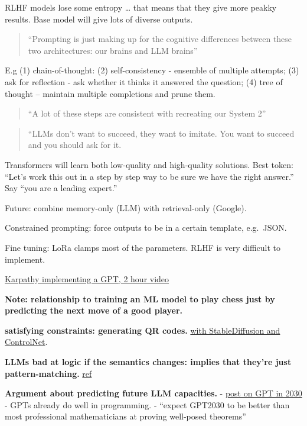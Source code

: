 \documentclass[
  11pt,
  letterpaper,
  DIV=11,
  numbers=noendperiod,
  oneside]{scrartcl}
\begin{document}
RLHF models lose some entropy \ldots{} that means that they give more
peakky results. Base model will give lots of diverse outputs.

\begin{quote}
``Prompting is just making up for the cognitive differences between
these two architectures: our brains and LLM brains''
\end{quote}

E.g (1) chain-of-thought: (2) self-consistency - ensemble of multiple
attempts; (3) ask for reflection - ask whether it thinks it answered the
question; (4) tree of thought -- maintain multiple completions and prune
them.

\begin{quote}
``A lot of these steps are consistent with recreating our System 2''
\end{quote}

\begin{quote}
``LLMs don't want to succeed, they want to imitate. You want to succeed
and you should ask for it.
\end{quote}

Transformers will learn both low-quality and high-quality solutions.
Best token: ``Let's work this out in a step by step way to be sure we
have the right answer.'' Say ``you are a leading expert.''

Future: combine memory-only (LLM) with retrieval-only (Google).

Constrained prompting: force outputs to be in a certain template,
e.g.~JSON.

Fine tuning: LoRa clamps most of the parameters. RLHF is very difficult
to implement.

\href{https://www.youtube.com/watch?v=kCc8FmEb1nY}{Karpathy implementing
a GPT, 2 hour video}

\textbf{Note: relationship to training an ML model to play chess just by
predicting the next move of a good player.}

\textbf{satisfying constraints: generating QR codes.}
\href{https://twitter.com/ben_ferns/status/1665907480600391682?s=20}{with
StableDiffusion and ControlNet}.

\textbf{LLMs bad at logic if the semantics changes: implies that they're
just pattern-matching.}
\href{https://twitter.com/arankomatsuzaki/status/1666799741785759745}{ref}

\textbf{Argument about predicting future LLM capacities.} -
\href{https://bounded-regret.ghost.io/what-will-gpt-2030-look-like/}{post
on GPT in 2030} - GPTs already do well in programming. - ``expect
GPT2030 to be better than most professional mathematicians at proving
well-posed theorems''
\end{document}
